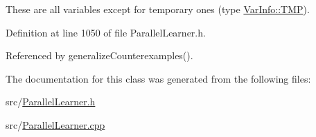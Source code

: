 These are all variables except for temporary ones (type \hyperlink{classVarInfo_a64d1da76cf84fe674e5fef9764ef11cfa84a2d8d86f004930fe564dc5b395b29f}{Var\-Info\-::\-T\-M\-P}). 

Definition at line 1050 of file Parallel\-Learner.\-h.



Referenced by generalize\-Counterexamples().



The documentation for this class was generated from the following files\-:\begin{DoxyCompactItemize}
\item 
src/\hyperlink{ParallelLearner_8h}{Parallel\-Learner.\-h}\item 
src/\hyperlink{ParallelLearner_8cpp}{Parallel\-Learner.\-cpp}\end{DoxyCompactItemize}
